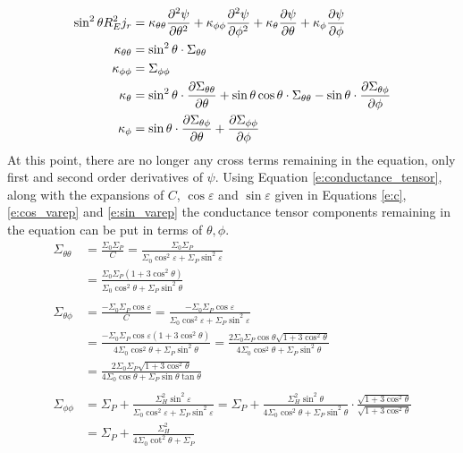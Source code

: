 \documentclass{article}
\begin{document}
\begin{equation}
	\begin{aligned}
        \label{e:coeff_form}
		\sin^2\theta R_E^2 j_r & = \kappa_{\theta\theta}\pdv[2]{\psi}{\theta} +
		\kappa_{\phi\phi} \pdv[2]{\psi}{\phi} +
		\kappa_{\theta} \pdv{\psi}{\theta} +
		\kappa_{\phi} \pdv{\psi}{\phi}                                                \\
		\kappa_{\theta\theta}  & = \sin^2 \theta \cdot  \Sigma_{\theta\theta}         \\
		\kappa_{\phi\phi}      & = \Sigma_{\phi\phi}                                  \\
		\kappa_{\theta}        & =
		\sin^2\theta\cdot \pdv{\Sigma_{\theta\theta}}{\theta}
		+ \sin \theta\cos\theta\cdot \Sigma_{\theta\theta}
		- \sin\theta\cdot\pdv{\Sigma_{\theta\phi}}{\phi}                              \\
		\kappa_{\phi}          & = \sin\theta\cdot\pdv{\Sigma_{\theta\phi}}{\theta} +
		\pdv{\Sigma_{\phi\phi}}{\phi}
	\end{aligned}
\end{equation}
At this point, there are no longer any cross terms remaining in the equation, only first and second order derivatives of $\psi$. Using Equation \ref{e:conductance_tensor}, along with the expansions of $C$, $\cos\varepsilon$ and $\sin\varepsilon$ given in Equations \ref{e:c}, \ref{e:cos_varep} and \ref{e:sin_varep} the conductance tensor components remaining in the equation can be put in terms of $\theta,\phi$. 
\begin{align*}
    \Sigma_{\theta\theta} 
        &= \frac{\Sigma_0\Sigma_P}{C}
        = \frac{\Sigma_0\Sigma_P}{\Sigma_0\cos^2 \varepsilon + \Sigma_P\sin^2\varepsilon}\\
        &= \frac{\Sigma_0\Sigma_P(1+3\cos^2\theta)}{\Sigma_0\cos^2 \theta+ \Sigma_P\sin^2\theta}\\\\
    \Sigma_{\theta\phi} 
        &= \frac{-\Sigma_0\Sigma_P\cos\varepsilon}{C}
        =\frac{-\Sigma_0\Sigma_P\cos\varepsilon}{\Sigma_0\cos^2 \varepsilon + \Sigma_P\sin^2\varepsilon}\\
        &= \frac{-\Sigma_0\Sigma_P\cos\varepsilon(1+3\cos^2\theta)}{4\Sigma_0\cos^2 \theta+ \Sigma_P\sin^2\theta}
        = \frac{2\Sigma_0\Sigma_P\cos\theta\sqrt{1+3\cos^2\theta}}{4\Sigma_0\cos^2 \theta+ \Sigma_P\sin^2\theta}\\
        &= \frac{2\Sigma_0\Sigma_P\sqrt{1+3\cos^2\theta}}{4\Sigma_0\cos \theta+ \Sigma_P\sin\theta\tan\theta}\\\\
    \Sigma_{\phi\phi} 
        &=  \Sigma_P + \frac{\Sigma_H^2\sin^2\varepsilon}{\Sigma_0\cos^2\varepsilon + \Sigma_P\sin^2\varepsilon} 
        = \Sigma_P + \frac{\Sigma_H^2\sin^2\theta}{4\Sigma_0\cos^2\theta+ \Sigma_P\sin^2\theta} \cdot \frac{\sqrt{1+3\cos^2\theta}}{\sqrt{1+3\cos^2\theta}}\\
        &= \Sigma_P + \frac{\Sigma^2_H}{4\Sigma_0\cot^2\theta + \Sigma_P}
\end{align*}
\end{document}
